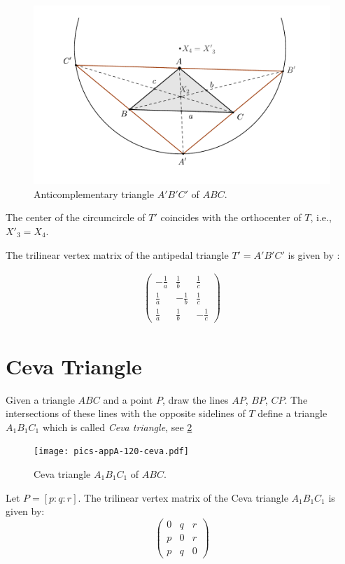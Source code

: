   \begin{figure}[H]
     \centering
      \includegraphics[scale=0.6]{zappA/pics/pics_appA_0100_anticimplementary.pdf}
    \caption{Anticomplementary triangle $A'B'C'$ of $ABC$.}
    \label{fig:pedal-triangle}
\end{figure}
The center of the circumcircle of $T'$ coincides with the orthocenter of $T$, i.e., $X'_3=X_4$.

The trilinear vertex matrix of the antipedal triangle $T'=A'B'C'$ is given by \cite{mw}:
 
\begin{align*}
   \left(\begin{matrix}-\frac{1}{a} &\frac{1}{b} &\frac{1}{c}\\
    \frac{1}{a} &-\frac{1}{b} &\frac{1}{c}\\
    \frac{1}{a} &\frac{1}{b} &-\frac{1}{c}\end{matrix}\right)
    \end{align*}
   
   \section{Ceva Triangle}
   
   Given a triangle $ABC$ and a point $P$, draw the lines $AP$, $BP$, $CP$. The intersections of these lines with the opposite sidelines of $T$ define a triangle $A_1B_1C_1$ which is called {\em Ceva triangle}, see \cref{fig:appA-ceva-triangle}
   
     \begin{figure}[H]
     \centering
      \texttt{[image: pics-appA-120-ceva.pdf]}
    \caption{Ceva triangle $A_1B_1C_1$ of $ABC$.}
    \label{fig:appA-ceva-triangle}
\end{figure}
Let $P=[p:q:r]$. The trilinear vertex matrix of the Ceva triangle $A_1B_1C_1$ is given by:
\[
\left( \begin{matrix}  0 & q & r \\  p & 0 & r
\\p & q & 0 \end{matrix} \right) \]


